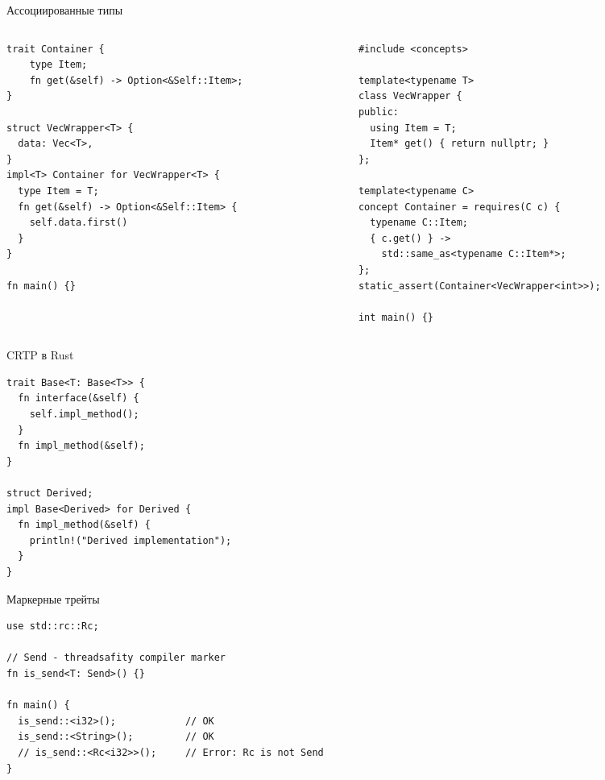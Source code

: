 \documentclass[aspectratio=169]{beamer}
\begin{document}

\begin{frame}[fragile]{Ассоциированные типы}
  \begin{columns}[T, onlytextwidth]
    \setlength{\columnsep}{0pt}
    \begin{column}{0.5\textwidth}
      \begin{verbatim}
trait Container {
    type Item;
    fn get(&self) -> Option<&Self::Item>;
}

struct VecWrapper<T> {
  data: Vec<T>,
}
impl<T> Container for VecWrapper<T> {
  type Item = T;
  fn get(&self) -> Option<&Self::Item> {
    self.data.first()
  }
}

fn main() {}
      \end{verbatim}
    \end{column}
    \begin{column}{0.5\textwidth}
      \begin{verbatim}
#include <concepts>

template<typename T>
class VecWrapper {
public:
  using Item = T;
  Item* get() { return nullptr; }
};

template<typename C>
concept Container = requires(C c) {
  typename C::Item;
  { c.get() } ->
    std::same_as<typename C::Item*>;
};
static_assert(Container<VecWrapper<int>>);

int main() {}
      \end{verbatim}
    \end{column}
  \end{columns}
\end{frame}


\begin{frame}[fragile]{CRTP в Rust}
\begin{verbatim}
trait Base<T: Base<T>> {
  fn interface(&self) {
    self.impl_method();
  }
  fn impl_method(&self);
}

struct Derived;
impl Base<Derived> for Derived {
  fn impl_method(&self) {
    println!("Derived implementation");
  }
}
\end{verbatim}
\end{frame}


\begin{frame}[fragile]{Маркерные трейты}
\begin{verbatim}
use std::rc::Rc;

// Send - threadsafity compiler marker
fn is_send<T: Send>() {}

fn main() {
  is_send::<i32>();            // OK
  is_send::<String>();         // OK
  // is_send::<Rc<i32>>();     // Error: Rc is not Send
}
\end{verbatim}
\end{frame}
\end{document}
